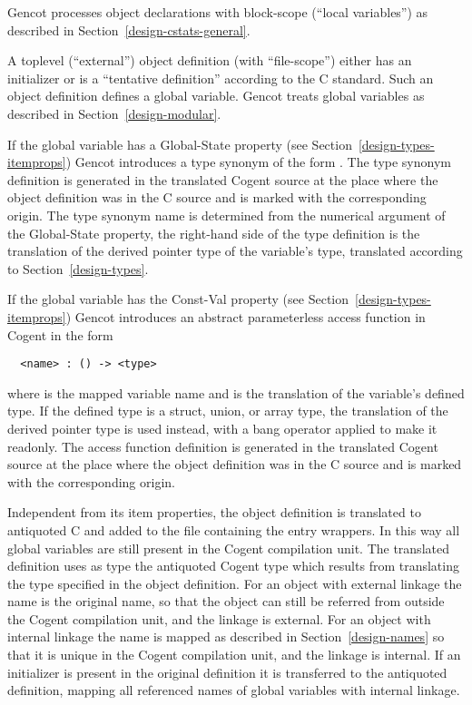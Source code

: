 Gencot processes object declarations with block-scope (``local variables'') as described in Section~\ref{design-cstats-general}. 

A toplevel (``external'') object definition (with ``file-scope'') either has an initializer or is a ``tentative definition''
according to the C standard. Such an object definition defines a global variable. Gencot treats global variables
as described in Section~\ref{design-modular}.

If the global variable has a Global-State property (see Section~\ref{design-types-itemprops}) Gencot introduces a type 
synonym of the form . The type synonym definition is generated in the translated Cogent source 
at the place where the object definition was in the C source and is marked with the corresponding origin. The 
type synonym name is determined from the numerical argument of the Global-State property, the right-hand side of
the type definition is the translation of the derived pointer type of the variable's type, translated according to
Section~\ref{design-types}.

If the global variable has the Const-Val property (see Section~\ref{design-types-itemprops}) Gencot introduces an abstract 
parameterless access function in Cogent in the form
\begin{verbatim}
  <name> : () -> <type>
\end{verbatim}
where  is the mapped variable name and  is the translation of the variable's defined type.
If the defined type is a struct, union, or array type, the translation of the derived pointer type is used instead,
with a bang operator applied to make it readonly. The access function definition is generated in the translated Cogent source 
at the place where the object definition was in the C source and is marked with the corresponding origin.

Independent from its item properties, the object definition is translated to antiquoted C and added to the file 
containing the entry wrappers. In this way all global variables are still present in the Cogent compilation unit.
The translated definition uses as type the antiquoted Cogent type which results from translating the type specified 
in the object definition. For an object with external linkage the name is the original name, so that the object can still
be referred from outside the Cogent compilation unit, and the linkage is external. For an object with internal linkage
the name is mapped as described in Section~\ref{design-names} so that it is unique in the Cogent compilation unit, and
the linkage is internal. If an initializer is present in the original definition it is transferred to the antiquoted
definition, mapping all referenced names of global variables with internal linkage.

